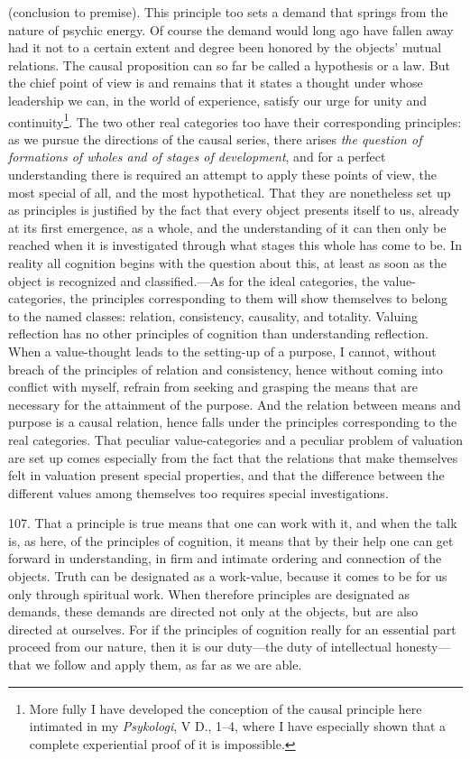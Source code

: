 \documentclass[12pt,a4paper]{book}
\newcommand{\opage}[1]{\marginnote{\footnotesize\textit{[#1]}}}
\begin{document}
(conclusion to premise). This principle too sets a demand that springs from
the nature of psychic energy. Of course the demand would long ago have fallen
away had it not to a certain extent and degree been honored by the objects'
mutual relations. The causal proposition can so far be called a hypothesis or
a law. But the chief point of view is and remains that it states a thought
under whose leadership we can, in the world of experience, satisfy our urge
for unity and continuity\footnote{More fully I have developed the conception
of the causal principle here intimated in my \emph{Psykologi}, V D., 1--4,
where I have especially shown that a complete experiential proof of it is
impossible.}. The two other real categories too have their corresponding
principles: as we pursue the directions of the causal series, there arises
\emph{the question of formations of wholes and of stages of development}, and
for a perfect understanding there is required an attempt to apply these points
of view, the most special of all, and the most hypothetical. That they are
nonetheless set up as principles is justified by the fact that every object
presents \opage{257}itself to us, already at its first emergence, as a whole, and the
understanding of it can then only be reached when it is investigated through
what stages this whole has come to be. In reality all cognition begins with
the question about this, at least as soon as the object is recognized and
classified.---As for the ideal categories, the value-categories, the
principles corresponding to them will show themselves to belong to the named
classes: relation, consistency, causality, and totality. Valuing reflection
has no other principles of cognition than understanding reflection. When a
value-thought leads to the setting-up of a purpose, I cannot, without breach
of the principles of relation and consistency, hence without coming into
conflict with myself, refrain from seeking and grasping the means that are
necessary for the attainment of the purpose. And the relation between means
and purpose is a causal relation, hence falls under the principles
corresponding to the real categories. That peculiar value-categories and a
peculiar problem of valuation are set up comes especially from the fact that
the relations that make themselves felt in valuation present special
properties, and that the difference between the different values among
themselves too requires special investigations.

107. That a principle is true means that one can work with it, and when the
talk is, as here, of the principles of cognition, it means that by their help
one can get forward in understanding, in firm and intimate ordering and
connection of the objects. Truth can be designated as a work-value, because it
comes to be for us only through spiritual work. When therefore principles are
designated as demands, these demands are directed not only at the objects, but
are also directed at ourselves. For if the principles of cognition really for
an essential part proceed from our nature, then it is our duty---the duty of
intellectual honesty---that we follow and apply them, as far as we are able.
\end{document}
